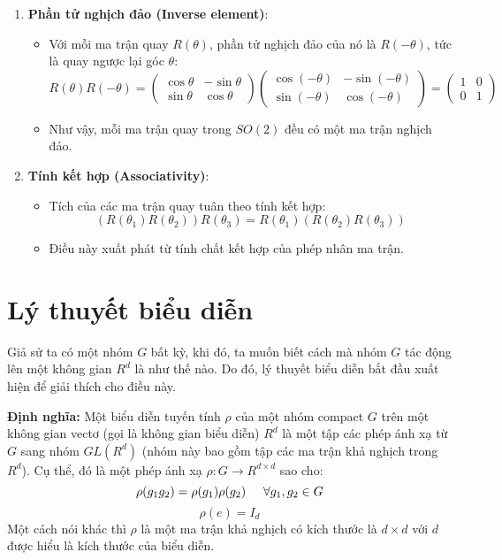 \begin{enumerate}
    \item \textbf{Phần tử nghịch đảo (Inverse element)}:
    \begin{itemize}
        \item Với mỗi ma trận quay \(R(\theta)\), phần tử nghịch đảo của nó là \(R(-\theta)\), tức là quay ngược lại góc \(\theta\):
        \[
        R(\theta)R(-\theta) = \begin{pmatrix}
        \cos{\theta} & -\sin{\theta} \\
        \sin{\theta} & \cos{\theta}
        \end{pmatrix}
        \begin{pmatrix}
        \cos{(-\theta)} & -\sin{(-\theta)} \\
        \sin{(-\theta)} & \cos{(-\theta)}
        \end{pmatrix}
        = \begin{pmatrix}
        1 & 0 \\
        0 & 1
        \end{pmatrix}
        \]
        \item Như vậy, mỗi ma trận quay trong \(SO(2)\) đều có một ma trận nghịch đảo.
    \end{itemize}
    
    \item \textbf{Tính kết hợp (Associativity)}:
    \begin{itemize}
        \item Tích của các ma trận quay tuân theo tính kết hợp:
        \[
        (R(\theta_1)R(\theta_2))R(\theta_3) = R(\theta_1)(R(\theta_2)R(\theta_3))
        \]
        \item Điều này xuất phát từ tính chất kết hợp của phép nhân ma trận.
    \end{itemize}
    
\end{enumerate}

\section{Lý thuyết biểu diễn}
Giả sử ta có một nhóm $G$ bất kỳ, khi đó, ta muốn biết cách mà nhóm $G$ tác động lên một không gian $R^d$ là như thế nào. Do đó, lý thuyết biểu diễn bắt đầu xuất hiện để giải thích cho điều này. 

\textbf{Định nghĩa:} Một biểu diễn tuyến tính $\rho$ của một nhóm compact $G$  trên một không gian vectơ (gọi là không gian biểu diễn) $R^d$ là một tập các phép ánh xạ từ $G$ sang nhóm $GL(R^d)$ (nhóm này bao gồm tập các ma trận khả nghịch trong $R^d$). Cụ thể, đó là một phép ánh xạ $\rho : G \rightarrow R^{d \times d}$ sao cho:
$$\rho (g_1 g_2) = \rho (g_1) \rho (g_2) \hspace{0.5cm} \forall g_1, g_2 \in G$$
$$\rho (e) = I_d$$
Một cách nói khác thì $\rho$ là một ma trận khả nghịch có kích thước là $d \times d$ với $d$ được hiểu là kích thước của biểu diễn.

